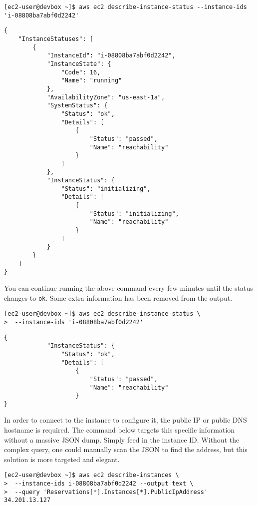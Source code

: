 \begin{verbatim}
[ec2-user@devbox ~]$ aws ec2 describe-instance-status --instance-ids 'i-08808ba7abf0d2242'
\end{verbatim}

\begin{verbatim}
{
    "InstanceStatuses": [
        {
            "InstanceId": "i-08808ba7abf0d2242", 
            "InstanceState": {
                "Code": 16, 
                "Name": "running"
            }, 
            "AvailabilityZone": "us-east-1a", 
            "SystemStatus": {
                "Status": "ok", 
                "Details": [
                    {
                        "Status": "passed", 
                        "Name": "reachability"
                    }
                ]
            }, 
            "InstanceStatus": {
                "Status": "initializing", 
                "Details": [
                    {
                        "Status": "initializing", 
                        "Name": "reachability"
                    }
                ]
            }
        }
    ]
}
\end{verbatim}

You can continue running the above command every few minutes until the status
changes to \verb|ok|. Some extra information has been removed from the output.

\begin{verbatim}
[ec2-user@devbox ~]$ aws ec2 describe-instance-status \
>  --instance-ids 'i-08808ba7abf0d2242'
\end{verbatim}

\begin{verbatim}
{
            "InstanceStatus": {
                "Status": "ok", 
                "Details": [
                    {
                        "Status": "passed", 
                        "Name": "reachability"
                    }
}
\end{verbatim}

In order to connect to the instance to configure it, the public IP or public
DNS hostname is required. The command below targets this specific information
without a massive JSON dump. Simply feed in the instance ID. Without the
complex query, one could manually scan the JSON to find the address, but this
solution is more targeted and elegant.

\begin{verbatim}
[ec2-user@devbox ~]$ aws ec2 describe-instances \
>  --instance-ids i-08808ba7abf0d2242 --output text \
>  --query 'Reservations[*].Instances[*].PublicIpAddress' 
34.201.13.127
\end{verbatim}

